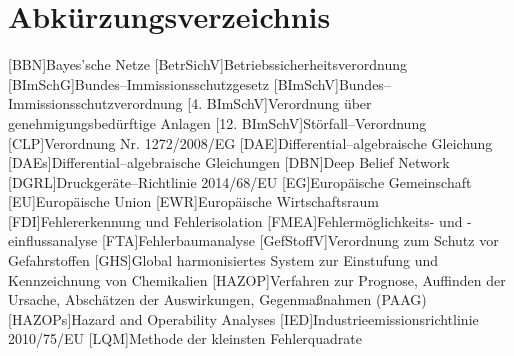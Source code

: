 \chapter*{Abk\"urzungsverzeichnis}
\begin{acronym}[12. BImSchV] %

 
  [BBN]{Bayes’sche Netze }
  [BetrSichV]{Betriebssicherheitsverordnung}
  [BImSchG]{Bundes--Immissionsschutzgesetz}
	[BImSchV]{Bundes--Immissionsschutzverordnung}
  [4. BImSchV]{Verordnung \"uber genehmigungsbed\"urftige Anlagen}
	[12. BImSchV]{St\"orfall--Verordnung}
  [CLP]{Verordnung Nr. 1272/2008/EG}
  [DAE]{Differential--algebraische Gleichung }
	[DAEs]{Differential--algebraische Gleichungen }
	[DBN]{Deep Belief Network}
  [DGRL]{Druckger\"ate--Richtlinie 2014/68/EU}
	[EG]{Europ\"aische Gemeinschaft} %
	[EU]{Europ\"aische Union} %
	[EWR]{Europ\"aische Wirtschaftsraum }
	[FDI]{Fehlererkennung und Fehlerisolation }
  [FMEA]{Fehlerm\"oglichkeits- und -einflussanalyse }
	[FTA]{Fehlerbaumanalyse }
	[GefStoffV]{Verordnung zum Schutz vor Gefahrstoffen}
	[GHS]{Global harmonisiertes System zur Einstufung und Kennzeichnung von Chemikalien}
	[HAZOP]{Verfahren zur Prognose, Auffinden der Ursache, Absch\"atzen der Auswirkungen, Gegenma\ss{}nahmen (PAAG) }
	[HAZOPs]{Hazard and Operability Analyses}
	[IED]{Industrieemissionsrichtlinie 2010/75/EU}
	[LQM]{Methode der kleinsten Fehlerquadrate }

\end{acronym}
